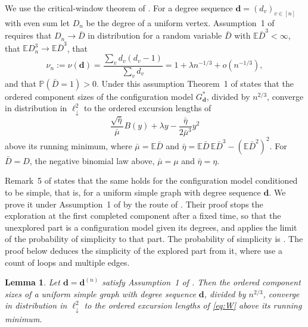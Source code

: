 \documentclass[11pt]{amsart}
\newtheorem{lemma}[theorem]{Lemma}
\theoremstyle{remark}
\numberwithin{equation}{section}
\newcommand{\PP}{\mathbb{P}}
\newcommand{\EE}{\mathbb{E}}
\newcommand{\ldown}{\ell^2_{\downarrow}}
\begin{document}
We use the critical-window theorem of \cite{DHLS17}. For a degree sequence $\boldsymbol d=(d_v)_{v\in[n]}$ with even sum let $D_n$ be the degree of a uniform vertex. Assumption~1 of \cite{DHLS17} requires that $D_n\to\bar D$ in distribution for a random variable $\bar D$ with $\EE\bar D^3<\infty$, that $\EE D_n^3\to\EE\bar D^3$, that
\begin{equation}\label{eq:nu}
\nu_n:=\nu(\boldsymbol d)=\frac{\sum_vd_v(d_v-1)}{\sum_vd_v}=1+\lambda n^{-1/3}+o(n^{-1/3}),
\end{equation}
and that $\PP(\bar D=1)>0$. Under this assumption Theorem~1 of \cite{DHLS17} states that the ordered component sizes of the configuration model $G^*_{\boldsymbol d}$, divided by $n^{2/3}$, converge in distribution in $\ldown$ to the ordered excursion lengths of
\begin{equation}\label{eq:W}
\frac{\sqrt{\bar\eta}}{\bar\mu}B(y)+\lambda y-\frac{\bar\eta}{2\bar\mu^3}y^2
\end{equation}
above its running minimum, where $\bar\mu=\EE\bar D$ and $\bar\eta=\EE\bar D\,\EE\bar D^3-(\EE\bar D^2)^2$. For $\bar D=D$, the negative binomial law above, $\bar\mu=\mu$ and $\bar\eta=\eta$.

Remark~5 of \cite{DHLS17} states that the same holds for the configuration model conditioned to be simple, that is, for a uniform simple graph with degree sequence $\boldsymbol d$. We prove it under Assumption~1 of \cite{DHLS17} by the route of \cite[Section~7]{DHLS20}. Their proof stops the exploration at the first completed component after a fixed time, so that the unexplored part is a configuration model given its degrees, and applies the limit of the probability of simplicity to that part. The probability of simplicity is \cite[Corollary~1.5]{Ja09}. The proof below deduces the simplicity of the explored part from it, where \cite{DHLS20} use a count of loops and multiple edges.

\begin{lemma}\label{lem:simple}
Let $\boldsymbol d=\boldsymbol d^{(n)}$ satisfy Assumption~1 of \cite{DHLS17}. Then the ordered component sizes of a uniform simple graph with degree sequence $\boldsymbol d$, divided by $n^{2/3}$, converge in distribution in $\ldown$ to the ordered excursion lengths of \eqref{eq:W} above its running minimum.
\end{lemma}
\end{document}
